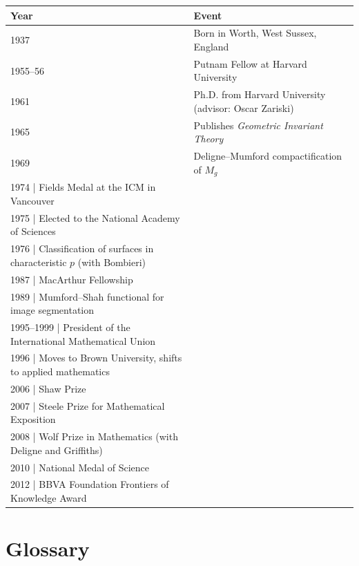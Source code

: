 \begin{tabularx}{\linewidth}{|p{1.5cm}|>{\raggedright\arraybackslash}X|}
\hline
\textbf{Year} & \textbf{Event} \\ \hline
1937 & Born in Worth, West Sussex, England \\ \hline
1955--56 & Putnam Fellow at Harvard University \\ \hline
1961 & Ph.D. from Harvard University (advisor: Oscar Zariski) \\ \hline
1965 & Publishes \textit{Geometric Invariant Theory} \\ \hline
1969 & Deligne--Mumford compactification of $M_g$ \\ \hline
1974 | Fields Medal at the ICM in Vancouver \\ \hline
1975 | Elected to the National Academy of Sciences \\ \hline
1976 | Classification of surfaces in characteristic $p$ (with Bombieri) \\ \hline
1987 | MacArthur Fellowship \\ \hline
1989 | Mumford--Shah functional for image segmentation \\ \hline
1995--1999 | President of the International Mathematical Union \\ \hline
1996 | Moves to Brown University, shifts to applied mathematics \\ \hline
2006 | Shaw Prize \\ \hline
2007 | Steele Prize for Mathematical Exposition \\ \hline
2008 | Wolf Prize in Mathematics (with Deligne and Griffiths) \\ \hline
2010 | National Medal of Science \\ \hline
2012 | BBVA Foundation Frontiers of Knowledge Award \\ \hline
\end{tabularx}

\section*{Glossary}


